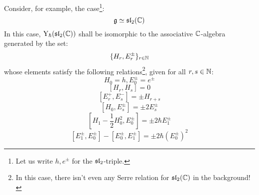             \begin{example} \label{example: Y(sl_2)}
                Consider, for example, the case\footnote{Let us write $h, e^{\pm}$ for the $\sl_2$-triple.}:
                    $$\g \cong \sl_2(\bbC)$$
                In this case, $\rmY_{\hbar}(\sl_2(\bbC))$ shall be isomorphic to the associative $\bbC$-algebra generated by the set:
                    $$\{ H_r, E_r^{\pm} \}_{r \in \N}$$
                whose elements satisfy the following relations\footnote{In this case, there isn't even any Serre relation for $\sl_2(\bbC)$ in the background!}, given for all $r, s \in \N$:
                    $$H_0 = h, E_0^{\pm} = e^{\pm}$$
                    $$[ H_r, H_s ] = 0$$
                    $$[ E_r^+, E_s^- ] = \pm H_{r + s}$$
                    $$[ H_0, E_s^{\pm} ] = \pm 2 E_s^{\pm}$$
                    $$\left[ H_1 - \frac12 H_0^2, E_0^{\pm} \right] = \pm 2 \hbar E_1^{\pm}$$
                    $$[ E_1^{\pm}, E_0^{\pm} ] - [ E_0^{\pm}, E_1^{\pm} ] = \pm 2\hbar (E_0^{\pm})^2$$
            \end{example}

